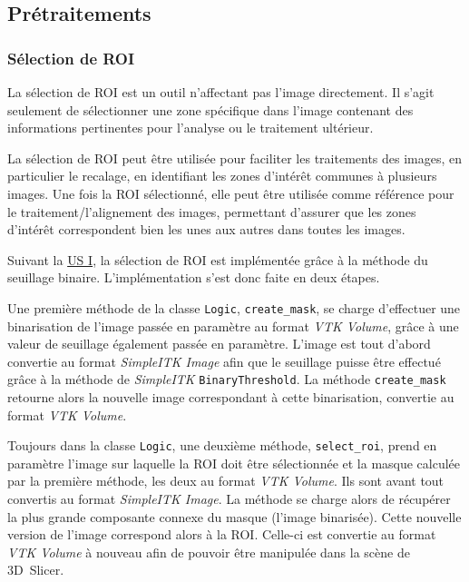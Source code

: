 \documentclass{article}
\begin{document}
{    %
    {
        \bigskip
        \subsection{Prétraitements}
        \label{subsec:preprocessing-implementation}

        {
            \subsubsection{Sélection de ROI}
            \label{subsubsec:roi-selection-preprocessing-implementation}

            La sélection de ROI est un outil n'affectant pas l'image directement. Il s'agit seulement de sélectionner une zone spécifique dans l'image contenant des informations pertinentes pour l'analyse ou le traitement ultérieur.

            La sélection de ROI peut être utilisée pour faciliter les traitements des images, en particulier le recalage, en identifiant les zones d'intérêt communes à plusieurs images. Une fois la ROI sélectionné, elle peut être utilisée comme référence pour le traitement/l'alignement des images, permettant d'assurer que les zones d'intérêt correspondent bien les unes aux autres dans toutes les images.

            \bigskip

            Suivant la \hyperref[us:preprocessing]{US I}, la sélection de ROI est implémentée grâce à la méthode du seuillage binaire. L'implémentation s'est donc faite en deux étapes.

            Une première méthode de la classe \texttt{Logic}, \texttt{create\_mask}, se charge d'effectuer une binarisation de l'image passée en paramètre au format \textit{VTK Volume}, grâce à une valeur de seuillage également passée en paramètre. L'image est tout d'abord convertie au format \textit{SimpleITK Image} afin que le seuillage puisse être effectué grâce à la méthode de \textit{SimpleITK} \texttt{BinaryThreshold}. La méthode \texttt{create\_mask} retourne alors la nouvelle image correspondant à cette binarisation, convertie au format \textit{VTK Volume}.

            Toujours dans la classe \texttt{Logic}, une deuxième méthode, \texttt{select\_roi}, prend en paramètre l'image sur laquelle la ROI doit être sélectionnée et la masque calculée par la première méthode, les deux au format \textit{VTK Volume}. Ils sont avant tout convertis au format \textit{SimpleITK Image}. La méthode se charge alors de récupérer la plus grande composante connexe du masque (l'image binarisée). Cette nouvelle version de l'image correspond alors à la ROI. Celle-ci est convertie au format \textit{VTK Volume} à nouveau afin de pouvoir être manipulée dans la scène de 3D~Slicer.

}}}
\end{document}
